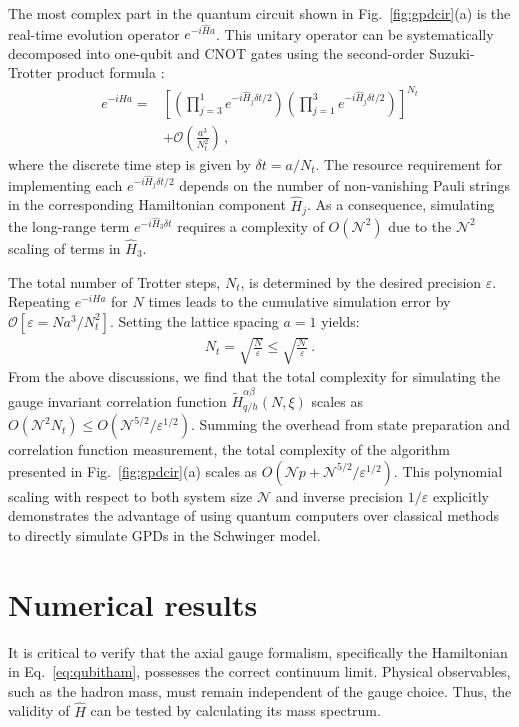 \documentclass[aps,prd,twocolumn,superscriptaddress,notitlepage,nofootinbib,preprintnumbers]{revtex4-1}
\begin{document}
The most complex part in the quantum circuit shown in Fig.~\ref{fig:gpdcir}(a) is the real-time evolution operator $e^{-i\hat Ha}$. This unitary operator can be systematically decomposed into one-qubit and CNOT gates using the second-order Suzuki-Trotter product formula \cite{Childs:2019hts}:
\begin{align}
    e^{-iHa} =& \left[\left(\prod_{j=3}^1e^{-i\hat{H}_j\delta t/2}\right)\left(\prod_{j=1}^3 e^{-i\hat{H}_j \delta t/2}\right)\right]^{N_t}\nonumber\\
    &+\mathcal{O}\left( \frac{a^3}{N_t^2}\right)\,,
\end{align}
where the discrete time step is given by $\delta t = a/N_t$.
The resource requirement for implementing each $e^{-i\hat{H}_j \delta t/2}$ depends on the number of non-vanishing Pauli strings in the corresponding Hamiltonian component $\hat{H}_j$.
As a consequence, simulating the long-range term $e^{-i \hat{H}_3 \delta t}$ requires a complexity of $O(\mathcal{N}^2)$ due to the $\mathcal{N}^2$ scaling of terms in $\hat{H}_3$.

The total number of Trotter steps, $N_t$, is determined by the desired precision $\varepsilon$. Repeating $e^{-iHa}$ for $N$ times leads to the cumulative simulation error by $\mathcal{O}[\varepsilon = Na^3/N_t^2]$. Setting the lattice spacing $a=1$ yields: 
\begin{align}
    N_t = \sqrt{\frac{N}{\varepsilon}} \leq \sqrt{\frac{\mathcal{N}}{\varepsilon}}\,.
\end{align}
From the above discussions, we find that the total complexity for simulating the gauge invariant correlation function $\tilde{H}^{\alpha\beta}_{q/h}(N,\xi)$ scales as $O(\mathcal{N}^2N_t) \leq O(\mathcal{N}^{5/2}/\varepsilon^{1/2})$. Summing the overhead from state preparation and correlation function measurement, the total complexity of the algorithm presented in Fig.~\ref{fig:gpdcir}(a) scales as $O(\mathcal{N}p+\mathcal{N}^{5/2}/\varepsilon^{1/2})$. 
This polynomial scaling with respect to both system size $\mathcal{N}$ and inverse precision $1/\varepsilon$ explicitly demonstrates the advantage of using quantum computers over classical methods to directly simulate GPDs in the Schwinger model.


\section{Numerical results}
\label{sec-res}
It is critical to verify that the axial gauge formalism, specifically the Hamiltonian in Eq.~\eqref{eq:qubitham}, possesses the correct continuum limit. Physical observables, such as the hadron mass, must remain independent of the gauge choice. Thus, the validity of $\hat{H}$ can be tested by calculating its mass spectrum.
\end{document}
